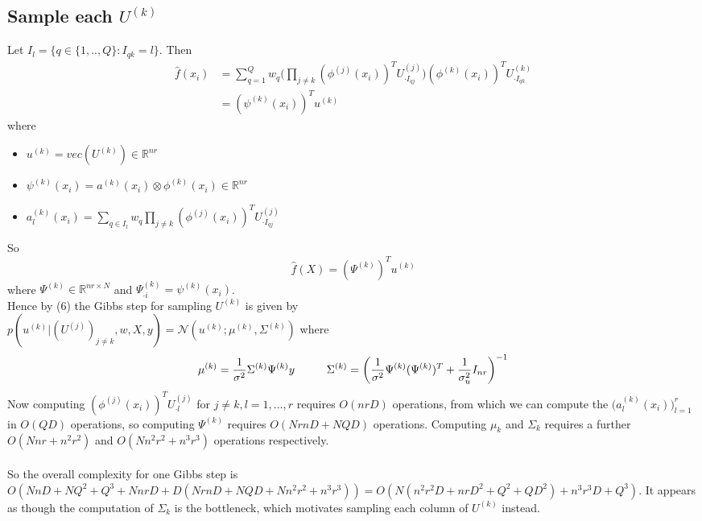 \documentclass[a4paper,10pt]{article}
\begin{document}
\subsection{Sample each $U^{(k)}$}
Let $I_l=\{q \in \{1,..,Q\}: I_{qk}=l \}$. Then
\begin{equation}
\begin{split}
\hat{f}(x_i)
& =\sum_{q=1}^Q w_q \bigg(\prod_{j \neq k} (\phi^{(j)}(x_i))^T U^{(j)}_{\cdot I_{qj}}\bigg)(\phi^{(k)}(x_i))^T U^{(k)}_{\cdot I_{qk}}  \\
& = (\psi^{(k)}(x_i))^T u^{(k)}
\end{split}
\end{equation}
where
\begin{itemize}
\item $u^{(k)}=vec(U^{(k)}) \in \mathbb{R}^{nr}$
\item $\psi^{(k)}(x_i)=a^{(k)}(x_i) \otimes \phi^{(k)}(x_i) \in \mathbb{R}^{nr}$
\item $a^{(k)}_l(x_i)=\sum_{q \in I_l} w_q \prod_{j \neq k} (\phi^{(j)}(x_i))^T U^{(j)}_{\cdot I_{qj}}$
\end{itemize}
So 
\begin{equation}
\hat{f}(X)=(\Psi^{(k)})^T u^{(k)}
\end{equation}
where $\Psi^{(k)} \in \mathbb{R}^{nr \times N}$ and $\Psi^{(k)}_{\cdot i}=\psi^{(k)}(x_i)$.\\ Hence by (6) the Gibbs step for sampling $U^{(k)}$ is given by \\ 
$p(u^{(k)}|(U^{(j)})_{j \neq k},w,X,y)=\mathcal{N}(u^{(k)};\mu^{(k)},\Sigma^{(k)})$ where
\begin{equation}
\mu^{(k)}=\frac{1}{\sigma^2}\Sigma^{(k)} \Psi^{(k)} y  \hspace{10 mm} \Sigma^{(k)} = \bigg( \frac{1}{\sigma^2}\Psi^{(k)}(\Psi^{(k)})^T + \frac{1}{\sigma_u^2}I_{nr} \bigg) ^{-1}
\end{equation}
Now computing $(\phi^{(j)}(x_i))^T U^{(j)}_{\cdot l}$ for $j\neq k, l=1,...,r$ requires $O(nrD)$ operations, from which we can compute the $\bigg(a^{(k)}_l(x_i)\bigg)_{l=1}^r$ in $O(QD)$ operations, so computing $\Psi^{(k)}$ requires $O(NrnD+NQD)$ operations. Computing $\mu_k$ and $\Sigma_k$ requires a further $O(Nnr+n^2r^2)$ and $O(Nn^2r^2+n^3r^3)$ operations respectively.
\\
\\
So the overall complexity for one Gibbs step is $O(NnD+ NQ^2 + Q^3 + NnrD + D(NrnD+NQD+Nn^2r^2+n^3r^3))=O(N(n^2r^2D+nrD^2+Q^2+QD^2)+n^3r^3D+Q^3)$. It appears as though the computation of $\Sigma_k$ is the bottleneck, which motivates sampling each column of $U^{(k)}$ instead.
\end{document}
